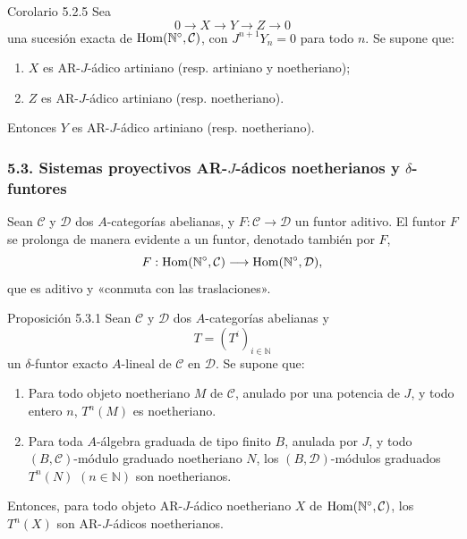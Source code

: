 \begin{statement}{Corolario 5.2.5}
Sea
\[
0\longrightarrow X\longrightarrow Y\longrightarrow Z\longrightarrow0
\]
una sucesión exacta de \(\operatorname{Hom}(\mathbb N^\circ,\mathcal C)\), con \(J^{n+1}Y_n=0\) para todo \(n\). Se supone que:
\begin{enumerate}[label=\textup{(\roman*)}]
\item \(X\) es AR-\(J\)-ádico artiniano (resp. artiniano y noetheriano);
\item \(Z\) es AR-\(J\)-ádico artiniano (resp. noetheriano).
\end{enumerate}
Entonces \(Y\) es AR-\(J\)-ádico artiniano (resp. noetheriano).
\end{statement}

\subsubsection*{5.3. Sistemas proyectivos AR-\(J\)-ádicos noetherianos y \(\delta\)-funtores}

Sean \(\mathcal C\) y \(\mathcal D\) dos \(A\)-categorías abelianas, y \(F:\mathcal C\to\mathcal D\) un funtor aditivo. El funtor \(F\) se prolonga de manera evidente a un funtor, denotado también por \(F\),
\[
F:\operatorname{Hom}(\mathbb N^\circ,\mathcal C)\longrightarrow\operatorname{Hom}(\mathbb N^\circ,\mathcal D),
\]
que es aditivo y «conmuta con las traslaciones».

\begin{statement}{Proposición 5.3.1}
Sean \(\mathcal C\) y \(\mathcal D\) dos \(A\)-categorías abelianas y
\[
T=(T^i)_{i\in\mathbb N}
\]
un \(\delta\)-funtor exacto \(A\)-lineal de \(\mathcal C\) en \(\mathcal D\). Se supone que:
\begin{enumerate}[label=\textup{(\roman*)}]
\item Para todo objeto noetheriano \(M\) de \(\mathcal C\), anulado por una potencia de \(J\), y todo entero \(n\), \(T^n(M)\) es noetheriano.
\item Para toda \(A\)-álgebra graduada de tipo finito \(B\), anulada por \(J\), y todo \((B,\mathcal C)\)-módulo graduado noetheriano \(N\), los \((B,\mathcal D)\)-módulos graduados \(T^n(N)\) \((n\in\mathbb N)\) son noetherianos.
\end{enumerate}
Entonces, para todo objeto AR-\(J\)-ádico noetheriano \(X\) de \(\operatorname{Hom}(\mathbb N^\circ,\mathcal C)\), los \(T^n(X)\) son AR-\(J\)-ádicos noetherianos.
\end{statement}
